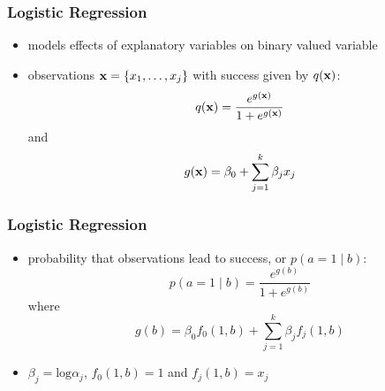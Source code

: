 \begin{frame}
\frametitle{Logistic Regression}
\begin{itemize}
\item models effects of explanatory variables on binary valued
  variable
\item observations ${\bf x} = \{x_1, \ldots, x_j\}$ with success given
  by $q({\bf x})$: \[ q({\bf x}) = \frac{e^{g({\bf x})}}{1 + e^{g({\bf
  x})}} \] and \[ g({\bf x}) = \beta_0 + \sum_{j=1}^{k} \beta_j x_j \]
\end{itemize} 
\end{frame} 

\begin{frame}
\frametitle{Logistic Regression}
\begin{itemize}
\item probability that observations lead to success, or $p(a=1 \mid
  b)$:
 \[ p(a=1 \mid b) = \frac{e^{g(b)}}{1 + e^{g(b)}} \] where
 \[ g(b) = \beta_0 f_0(1,b) + \sum_{j=1}^{k} \beta_j f_j(1,b) \]
\item $\beta_j = \textrm{log} \alpha_j$, $f_0(1,b) = 1$ and $f_j(1,b) = x_j$
\end{itemize} 
\end{frame} 
